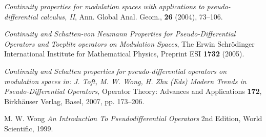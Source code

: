 \documentclass[12pt,a4paper,reqno]{amsart}
\numberwithin{equation}{section}
\numberwithin{thm}{section}
\theoremstyle{definition}
\theoremstyle{remark}
\begin{document}
\begin{thebibliography}{150}
 \bysame \emph{Continuity
properties for modulation spaces with applications to
pseudo-differential calculus, II}, {Ann. Global Anal. Geom.},
\textbf{26} (2004), 73--106.

 \bysame \emph{Continuity and Schatten-von Neumann
Properties for Pseudo-Differential Operators and Toeplitz
operators on Modulation Spaces}, The Erwin Schr{\"o}dinger
International Institute for Mathematical Physics, Preprint ESI
\textbf{1732} (2005).

 \bysame \emph{Continuity and Schatten
properties for pseudo-differential operators on modulation spaces {\rm
{in: J. Toft, M. W. Wong, H. Zhu (Eds) Modern Trends in
Pseudo-Differential Operators,}}} Operator Theory: Advances and
Applications \textbf{172}, Birkh{\"a}user Verlag, Basel, 2007,
pp. 173--206.

 M. W. Wong \newblock \textit{An Introduction To
Pseudodifferential Operators} 2nd Edition, World Scientific, 1999.
\end{thebibliography}
\end{document}

